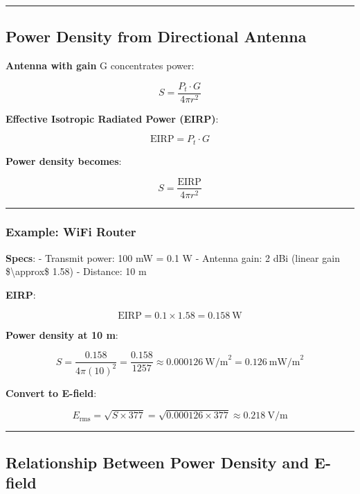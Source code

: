 \begin{center}\rule{0.5\linewidth}{0.5pt}\end{center}

\subsection{Power Density from Directional
Antenna}\label{power-density-from-directional-antenna}

\textbf{Antenna with gain} G concentrates power:

\[
S = \frac{P_t \cdot G}{4\pi r^2}
\]

\textbf{Effective Isotropic Radiated Power (EIRP)}:

\[
\text{EIRP} = P_t \cdot G
\]

\textbf{Power density becomes}:

\[
S = \frac{\text{EIRP}}{4\pi r^2}
\]

\begin{center}\rule{0.5\linewidth}{0.5pt}\end{center}

\subsubsection{Example: WiFi Router}\label{example-wifi-router}

\textbf{Specs}: - Transmit power: 100 mW = 0.1 W - Antenna gain: 2 dBi
(linear gain \$\textbackslash approx\$ 1.58) - Distance: 10 m

\textbf{EIRP}:

\[
\text{EIRP} = 0.1 \times 1.58 = 0.158\ \text{W}
\]

\textbf{Power density at 10 m}:

\[
S = \frac{0.158}{4\pi (10)^2} = \frac{0.158}{1257} \approx 0.000126\ \text{W/m}^2 = 0.126\ \text{mW/m}^2
\]

\textbf{Convert to E-field}:

\[
E_{\text{rms}} = \sqrt{S \times 377} = \sqrt{0.000126 \times 377} \approx 0.218\ \text{V/m}
\]

\begin{center}\rule{0.5\linewidth}{0.5pt}\end{center}

\subsection{Relationship Between Power Density and
E-field}\label{relationship-between-power-density-and-e-field}

